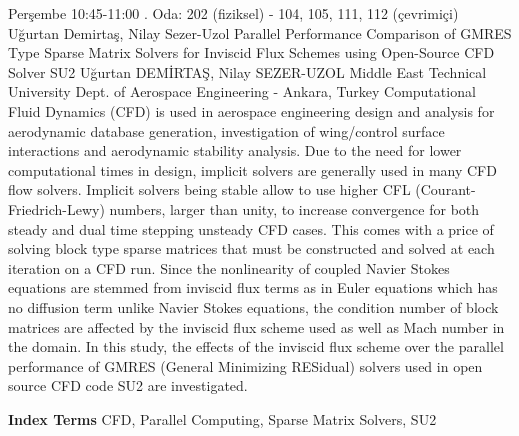 
    \begin{abstract_basarim}
    {Perşembe 10:45-11:00}
    {.}
    {Oda: 202 (fiziksel) - 104, 105, 111, 112 (çevrimiçi)}
    {Uğurtan Demirtaş, Nilay Sezer-Uzol}
    {Parallel Performance Comparison of GMRES Type Sparse Matrix Solvers for Inviscid Flux Schemes using Open-Source CFD Solver SU2}
    {%
    Uğurtan DEMİRTAŞ, Nilay SEZER-UZOL}
    {%
    }
    {%
    Middle East Technical University Dept. of Aerospace Engineering - Ankara, Turkey}
    Computational Fluid Dynamics (CFD) is used in aerospace engineering design and analysis for aerodynamic database generation, investigation of wing/control surface interactions and aerodynamic stability analysis. Due to the need for lower computational times in design, implicit solvers are generally used in many CFD flow solvers. Implicit solvers being stable allow to use higher CFL (Courant-Friedrich-Lewy) numbers, larger than unity, to increase convergence for both steady and dual time stepping unsteady CFD cases. This comes with a price of solving block type sparse matrices that must be constructed and solved at each iteration on a CFD run. Since the nonlinearity of coupled Navier Stokes equations are stemmed from inviscid flux terms as in Euler equations which has no diffusion term unlike Navier Stokes equations, the condition number of block matrices are affected by the inviscid flux scheme used as well as Mach number in the domain. In this study, the effects of the inviscid flux scheme over the parallel performance of GMRES (General Minimizing RESidual) solvers used in open source CFD code SU2 are investigated. 
    
            \textbf{Index Terms} \newline{}CFD, Parallel Computing, Sparse Matrix Solvers, SU2
    \end{abstract_basarim}
    